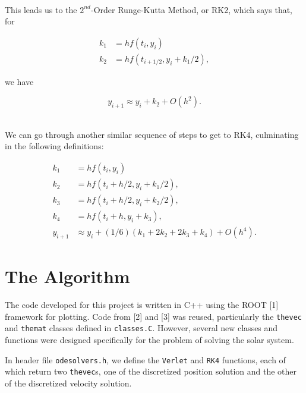 \documentclass[12pt]{article}
\numberwithin{equation}{section}
\begin{document}
\\\indent This leads us to the $2^{nd}$-Order Runge-Kutta Method, or RK2, which says that, for

\begin{equation}
\label{eq:rk2part1}
\begin{align}
k_{1} & = hf\left(t_{i},y_{i}\right) \\
k_{2} & = hf\left(t_{i+1/2},y_{i}+k_{1}/2\right),
\end{align}
\end{equation}

\noindent we have

\begin{equation}
\label{eq:re2part2}
y_{i+1} \approx y_{i}+k_{2}+O\left(h^{2}\right).
\end{equation}

\\\indent We can go through another similar sequence of steps to get to RK4, culminating in the following definitions:

\begin{equation}
\label{eq:rk4}
\begin{align}
k_{1} & = hf\left(t_{i},y_{i}\right) \\
k_{2} & = hf\left(t_{i}+h/2,y_{i}+k_{1}/2\right), \\
k_{3} & = hf\left(t_{i}+h/2,y_{i}+k_{2}/2\right), \\
k_{4} & = hf\left(t_{i}+h,y_{i}+k_{3}\right), \\
y_{i+1} & \approx y_{i}+\left(1/6\right)\left(k_{1}+2k_{2}+2k_{3}+k_{4}\right)+O\left(h^{4}\right).
\end{align}
\end{equation}

\section{The Algorithm}
\label{sec:algorithm}

The code developed for this project is written in C++ using the ROOT [1] framework for plotting.  Code from [2] and [3] was reused, particularly the \texttt{thevec} and \texttt{themat} classes defined in \texttt{classes.C}.  However, several new classes and functions were designed specifically for the problem of solving the solar system.
\par In header file \texttt{odesolvers.h}, we define the \texttt{Verlet} and \texttt{RK4} functions, each of which return two \texttt{thevec}s, one of the discretized position solution and the other of the discretized velocity solution.  
\end{document}
